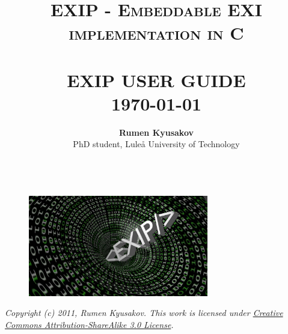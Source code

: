 \documentclass[paper=a4, fontsize=11pt]{scrartcl}	%
\title{	\normalsize \textsc{EXIP - Embeddable EXI implementation in C} 	%
		 	\\[2.0cm]													%
			\HRule{0.5pt} \\										%
			\LARGE \textbf{\uppercase{EXIP User Guide}}	%
			\HRule{2pt} \\ [0.5cm]								%
			\normalsize \today									%
		}
\author{
		\textbf{Rumen Kyusakov}\\	
		PhD student, Lule{\aa} University of Technology\\ [0.5cm]
		\HRule{0.5pt} \\ [0.5cm]
}
\makeatletter
\numberwithin{equation}{section}															%
\numberwithin{figure}{section}																%
\numberwithin{table}{section}																%
\def\printtitle{%
    {\centering \@title\par}}
\def\printauthor{%
    {\centering \large \@author}}
\makeatother
\begin{document}
\thispagestyle{empty}				%

\printtitle									%
  	\vfill
\begin{figure}[!h]
 \begin{center}
 \includegraphics[width=0.70\textwidth, keepaspectratio=true]{images/logo.pdf} \\ [3.5cm]
\end{center}
\end{figure} 

\printauthor

\textit{Copyright (c) 2011, Rumen Kyusakov. This work is licensed under \href{http://creativecommons.org/licenses/by-sa/3.0/}{Creative Commons Attribution-ShareAlike 3.0 License}.}

\clearpage

\thispagestyle{empty}				%

\tableofcontents

\clearpage

\setcounter{page}{1}















\end{document}
